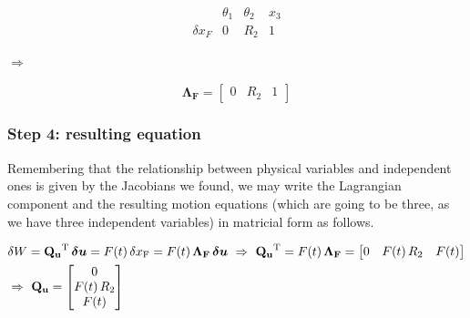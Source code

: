 \documentclass[a4paper,12pt,oneside]{article}
\begin{document}
\vspace{30pt}

\begin{minipage}{0.4\textwidth}
	\[
		\begin{array}{c||c|c|c}
									& \theta_1	& \theta_2	& x_3 \\
			\hline \hline
			\delta x_F	&	0					&	R_2				& 1
		\end{array}
	\]
\end{minipage}
\begin{minipage}{0.1\textwidth}
	$ \Longrightarrow $
\end{minipage}
\begin{minipage}{0.5\textwidth}
	\[
		\mathbf{\Lambda_F} =
		\begin{bmatrix}
			0	& R_2	& 1
		\end{bmatrix}
	\]
\end{minipage}

\vspace{40pt}

\subsubsection*{Step 4: resulting equation}

Remembering that the relationship between physical variables and independent ones is given by the Jacobians we found, we may write the Lagrangian component and the resulting motion equations (which are going to be three, as we have three independent variables) in matricial form as follows.

\[ \begin{split}
	& \delta W = \mathbf{Q_u}^\textup{T} \, \bm{\delta u} =
		F(t) \, \delta x_\textup{F} = F(t) \, \mathbf{\Lambda_F} \, \bm{\delta u}
		~ \Rightarrow ~ \mathbf{Q_u}^\textup{T} = F(t) \, \mathbf{\Lambda_F} =
		\begin{bmatrix}
			0	& F(t) \, R_2	& F(t)
		\end{bmatrix} \\
	& \Rightarrow ~ \mathbf{Q_u} =	\begin{bmatrix}
																		0 \\
																		F(t) \, R_2 \\
																		F(t)
																	\end{bmatrix}
\end{split} \]
\end{document}
